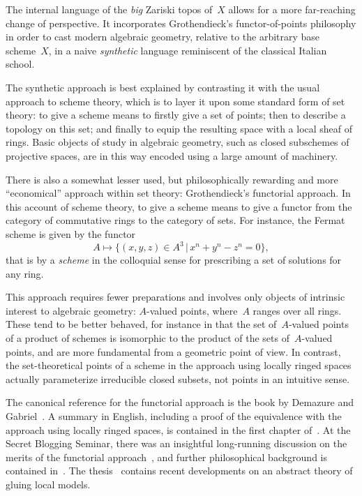 \documentclass[10pt,reqno,a4paper]{amsbook}
\theoremstyle{definition}
\theoremstyle{plain}
\theoremstyle{remark}
\newcommand{\?}{\,{:}\,}
\renewcommand{\_}{\mathpunct{.}\,}
\begin{document}
{The internal language of the \emph{big} Zariski topos of~$X$ allows for a more far-reaching
change of perspective. It incorporates Grothendieck's functor-of-points
philosophy in order to cast modern algebraic geometry, relative to the arbitrary
base scheme~$X$, in a naive \emph{synthetic} language reminiscent of the classical
Italian school.

The synthetic approach is best explained by contrasting it with the usual
approach to scheme theory, which is to layer it upon some standard form of set theory:
to give a scheme means to firstly give a set of points; then
to describe a topology on this set; and finally to equip the resulting space
with a local sheaf of rings. Basic objects of study in algebraic geometry, such
as closed subschemes of projective spaces, are in this way encoded using a large
amount of machinery.

There is also a somewhat lesser used, but philosophically rewarding and more
``economical'' approach within set theory: Grothendieck's functorial approach.
In this account of scheme theory, to give a scheme means to give a functor
from the category of commutative rings to the category of sets. For instance,
the Fermat scheme is given by the functor
\[ A \longmapsto \{ (x,y,z) \in A^3 \,|\, x^n + y^n - z^n = 0 \}, \]
that is by a \emph{scheme} in the colloquial sense for prescribing a set of
solutions for any ring.

This approach requires fewer preparations and involves
only objects of intrinsic interest to algebraic geometry: $A$-valued points,
where~$A$ ranges over all rings. These tend to be better behaved, for instance in
that the set of~$A$-valued points of a product of schemes is isomorphic to the
product of the sets of~$A$-valued points, and are more fundamental from a
geometric point of view. In contrast, the set-theoretical points of a scheme in
the approach using locally ringed spaces actually parameterize irreducible
closed subsets, not points in an intuitive sense.

The canonical reference for the functorial approach is the book by Demazure and
Gabriel~\cite{demazure:gabriel}. A summary in English, including a proof of the
equivalence with the approach using locally ringed spaces, is contained in the
first chapter of~\cite{vezzani:fun}. At the Secret Blogging Seminar, there was
an insightful long-running discussion on the merits of the functorial
approach~\cite{secret-blogging-seminar:fpov}, and further philosophical background
is contained in~\cite{mclarty:ontology}. The thesis~\cite{low:local-models}
contains recent developments on an abstract theory of gluing local models.

}
\end{document}
